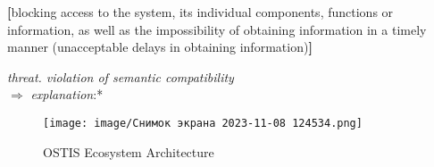 \documentclass{article}
\begin{document}
\begin{multicols}{2}
\begin{description}[leftmargin=!, labelwidth=1cm, itemsep=-1.5mm]
   \par 
   \begin{description}[leftmargin=!, labelwidth=1cm, itemsep=-1.5mm]
   \item \vspace{-0.5cm} \textbf{[}blocking access to the system, its individual components, functions or information,
as well as the impossibility of obtaining
information in a timely manner (unacceptable delays in obtaining information)\textbf{]}
\end{description}
 \item[$\supset$] \vspace{-0.2cm} \textit {threat. violation of semantic compatibility} \\
   \vspace{0.1cm} \hspace{-0.23cm}  $\Rightarrow$  \hspace{0.5cm} \textit{explanation}:* 
\end{description}
\end{multicols}
\begin{figure}
    \centering
    \texttt{[image: image/Снимок экрана 2023-11-08 124534.png]}
    \caption{OSTIS Ecosystem Architecture}
    \label{fig:enter-label}
\end{figure}
\end{document}
